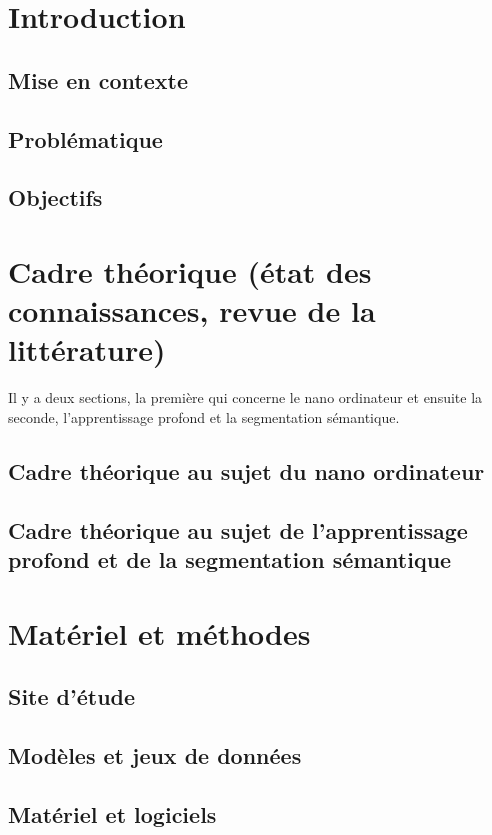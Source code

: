 \documentclass[12pt, letterpaper]{article}
\begin{document}
\section{Introduction}
\subsection{Mise en contexte}

\subsection{Problématique}

\subsection{Objectifs}

\section{Cadre théorique (état des connaissances, revue de la littérature)}
Il y a deux sections, la première qui concerne le nano ordinateur et ensuite la seconde, l'apprentissage profond et la segmentation sémantique.
\subsection{Cadre théorique au sujet du nano ordinateur}

\subsection{Cadre théorique au sujet de l'apprentissage profond et de la segmentation sémantique}

\section{Matériel et méthodes}
\subsection{Site d'étude}

\subsection{Modèles et jeux de données}

\subsection{Matériel et logiciels}

\end{document}
